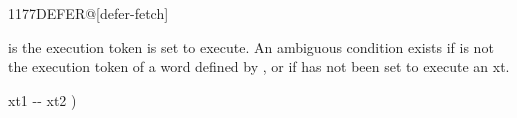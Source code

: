 \begin{worddef}{1177}{DEFER@}[defer-fetch]%
\item {}

	 is the execution token  is set to execute.
	An ambiguous condition exists if  is not
	the execution token of a word defined by ,
	or if  has not been set to execute an xt. 


	\begin{implement} %
		\word{:}   xt1 -{}- xt2 ) \\
		\tab {}  \word{;}
	\end{implement}

	\begin{testing} %

		 \\
		 \\

		 \\
		 \\
	\end{testing}
\end{worddef}

